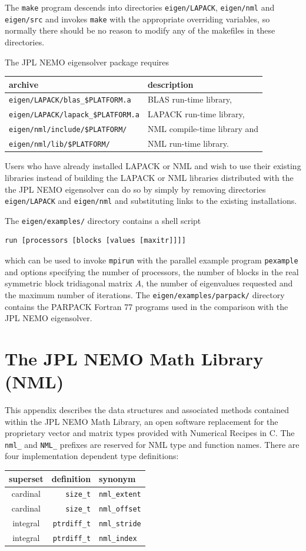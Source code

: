 \documentclass[twoside,12pt]{article}
\begin{document}
The {\tt make} program descends into directories
{\tt eigen/LAPACK}, {\tt eigen/nml} and {\tt eigen/src}
and invokes {\tt make} with the appropriate overriding variables,
so normally there should be no reason to modify any of the makefiles
in these directories.

The JPL NEMO eigensolver package requires
\begin{center}
\begin{tabular}{l|l}
archive						& description		\\
\hline
{\tt eigen/LAPACK/blas\_\$PLATFORM.a}	& BLAS run-time library,	\\
{\tt eigen/LAPACK/lapack\_\$PLATFORM.a}	& LAPACK run-time library,	\\
{\tt eigen/nml/include/\$PLATFORM/}	& NML compile-time library and	\\
{\tt eigen/nml/lib/\$PLATFORM/}		& NML run-time library.
\end{tabular}
\end{center}
Users who have already installed LAPACK or NML
and wish to use their existing libraries
instead of building the LAPACK or NML libraries
distributed with the the JPL NEMO eigensolver
can do so by simply by removing directories
{\tt eigen/LAPACK} and {\tt eigen/nml}
and substituting links to the existing installations.

The {\tt eigen/examples/} directory contains a shell script
\begin{verbatim}
run [processors [blocks [values [maxitr]]]]
\end{verbatim}
which can be used to invoke {\tt mpirun} with the parallel example program
{\tt pexample} and options specifying the number of processors,
the number of blocks in the real symmetric block tridiagonal matrix $A$,
the number of eigenvalues requested and the maximum number of iterations.
The {\tt eigen/examples/parpack/} directory
contains the PARPACK Fortran 77 programs used in the comparison
with the JPL NEMO eigensolver.

\section{The JPL NEMO Math Library (NML)}\label{app:nml}
This appendix describes the data structures and associated methods
contained within the JPL NEMO Math Library, an open software replacement
for the proprietary vector and matrix types
provided with Numerical Recipes in C\cite{press}.
The {\tt nml\_} and {\tt NML\_} prefixes are reserved
for NML type and function names.
There are four implementation dependent type definitions:
\begin{center}
\begin{tabular}{c|r|l}
superset&	definition	&synonym		\\
\hline
cardinal&	{\tt size\_t}	&{\tt nml\_extent}	\\
cardinal&	{\tt size\_t}	&{\tt nml\_offset}	\\
integral&	{\tt ptrdiff\_t}&{\tt nml\_stride}	\\
integral&	{\tt ptrdiff\_t}&{\tt nml\_index}
\end{tabular}
\end{center}
\end{document}
